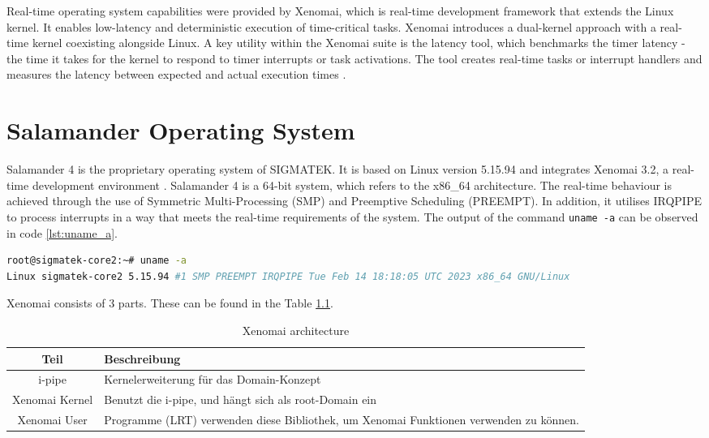 \documentclass[MMR,Master,english]{twbook}
\begin{document}
\bigskip \noindent Real-time operating system capabilities were provided by Xenomai, which is real-time development framework that extends the Linux kernel. It enables low-latency and deterministic execution of time-critical tasks. Xenomai introduces a dual-kernel approach with a real-time kernel coexisting alongside Linux. A key utility within the Xenomai suite is the latency tool, which benchmarks the timer latency - the time it takes for the kernel to respond to timer interrupts or task activations. The tool creates real-time tasks or interrupt handlers and measures the latency between expected and actual execution times \cite{XenomaiXenomai}.


\clearpage 
\chapter{Salamander Operating System}

Salamander 4 is the proprietary operating system of SIGMATEK. It is based on Linux version 5.15.94 and integrates Xenomai 3.2, a real-time development environment \cite{XenomaiXenomai}. Salamander 4 is a 64-bit system, which refers to the x86\_64 architecture. The real-time behaviour is achieved through the use of Symmetric Multi-Processing (SMP) and Preemptive Scheduling (PREEMPT). In addition, it utilises IRQPIPE to process interrupts in a way that meets the real-time requirements of the system. The output of the command \texttt{uname -a} can be observed in code \ref{lst:uname_a}.

\vspace{1em}
\begin{minipage}{0.95\columnwidth}
\begin{lstlisting}[language=bash,name={System information},label={lst:uname_a}]
root@sigmatek-core2:~# uname -a
Linux sigmatek-core2 5.15.94 #1 SMP PREEMPT IRQPIPE Tue Feb 14 18:18:05 UTC 2023 x86_64 GNU/Linux
\end{lstlisting}
\end{minipage}



Xenomai consists of 3 parts. These can be found in the Table \ref{tab:what_is_xenomai}.

\begin{table}[!h]
    \centering
    \caption[Xenomai architecture]{Xenomai architecture}
    \label{tab:what_is_xenomai}
    \setlength{\tabcolsep}{0.5em} %
    {\renewcommand{\arraystretch}{1.2}%
    \begin{tabular}{|c|p{}|}
        \hline
        \textbf{Teil} & \textbf{Beschreibung} \\ \hline
        i-pipe  & Kernelerweiterung für das Domain-Konzept \\ \hline
        Xenomai Kernel & Benutzt die i-pipe, und hängt sich als root-Domain ein \\ \hline
        Xenomai User &  Programme (LRT) verwenden diese Bibliothek, um Xenomai Funktionen verwenden zu können. \\ \hline
    \end{tabular}}
  \end{table}
  
\end{document}
